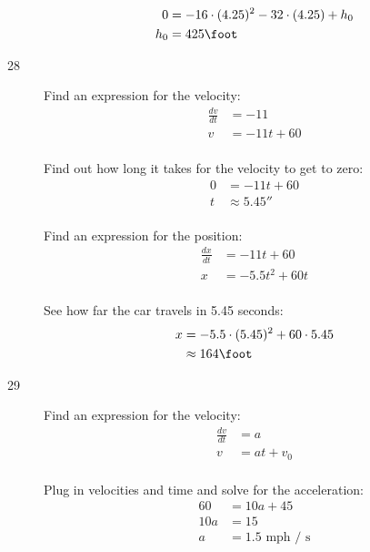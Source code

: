 \documentclass{exam}
\begin{document}
\begin{description}
\begin{align*}
  0 &= -16 \cdot (4.25)^2 - 32 \cdot (4.25) + h_0 \\
  h_0 &= 425 \foot \\
\end{align*}

\pagebreak

\item[28]
Find an expression for the velocity:
\begin{align*}
  \frac{dv}{dt} &= -11 \\
  v &= -11t + 60 \\
\end{align*}

Find out how long it takes for the velocity to get to zero:
\begin{align*}
  0 &= -11t + 60 \\
  t &\approx 5.45 \second \\
\end{align*}

Find an expression for the position:
\begin{align*}
  \frac{dx}{dt} &= -11t + 60 \\
  x &= -5.5t^2 + 60t \\
\end{align*}

See how far the car travels in 5.45 seconds:
\begin{align*}
  x &= -5.5 \cdot (5.45)^2 + 60 \cdot 5.45 \\
    &\approx 164 \foot \\
\end{align*}

\item[29]
Find an expression for the velocity:
\begin{align*}
  \frac{dv}{dt} &= a \\
  v &= at + v_0 \\
\end{align*}

Plug in velocities and time and solve for the acceleration:
\begin{align*}
  60 &= 10a + 45 \\
  10a &= 15 \\
  a   &= 1.5 \text{ mph / s}\\
\end{align*}



\end{description}
\end{document}
